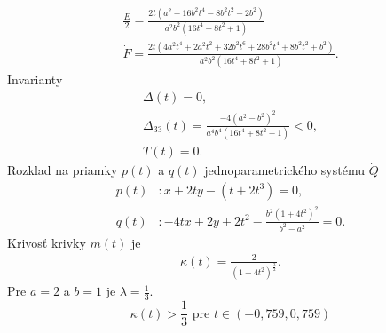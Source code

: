 \begin{example}[Parabola]
\begin{gather*}
\frac{\dot{E}}{2} = \frac{2 t \left(a^{2} - 16 b^{2} t^{4} - 8 b^{2} t^{2} - 2 b^{2}\right)}{a^{2} b^{2} \left(16 t^{4} + 8 t^{2} + 1\right)}\\
\dot{F} = \frac{2 t \left(4 a^{2} t^{4} + 2 a^{2} t^{2} + 32 b^{2} t^{6} + 28 b^{2} t^{4} + 8 b^{2} t^{2} + b^{2}\right)}{a^{2} b^{2} \left(16 t^{4} + 8 t^{2} + 1\right)}.
\end{gather*}
Invarianty 
\begin{gather*}
\Delta(t) = 0, \\
\Delta_{33}(t) = \frac{-4 (a^2 - b^2)^2}{a^{4} b^{4} \left(16 t^{4} + 8 t^{2} + 1\right)} < 0, \\
T(t) = 0.
\end{gather*}
Rozklad na priamky $p(t)$ a $q(t)$ jednoparametrického systému $\dot{Q}$  
\begin{align*}
p(t)& \colon x+2ty - \left(t + 2t^{3}\right)=0, \\
q(t)& \colon -4tx+2y+2t^{2}-\frac{b^{2}\left(1+4t^{2}\right)^{2}}{b^{2}-a^{2}}=0.
\end{align*}
Krivosť krivky $m(t)$ je
\begin{align*}
\kappa(t) = \frac{2}{\left(1+4t^{2}\right)^{\frac{3}{2}}}.
\end{align*}
Pre $a=2$ a $b=1$ je $\lambda = \frac{1}{3}$.
$$
\kappa(t) > \frac{1}{3} \text{ pre } t \in (-0,759,0,759)
$$
\end{example}
